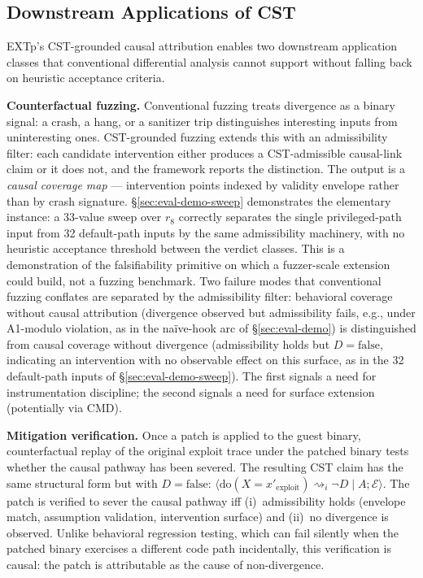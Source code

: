 \documentclass[conference]{IEEEtran}
\begin{document}
\subsection{Downstream Applications of CST}\label{sec:discussion-fuzz}

EXTp's CST-grounded causal attribution enables two downstream
application classes that conventional differential analysis cannot
support without falling back on heuristic acceptance criteria.

\textbf{Counterfactual fuzzing.} Conventional fuzzing treats
divergence as a binary signal: a crash, a hang, or a sanitizer
trip distinguishes interesting inputs from uninteresting ones.
CST-grounded fuzzing extends this with an admissibility filter:
each candidate intervention either produces a CST-admissible
causal-link claim or it does not, and the framework reports the
distinction. The output is a \emph{causal coverage map} ---
intervention points indexed by validity envelope rather than by
crash signature. \S\ref{sec:eval-demo-sweep} demonstrates the
elementary instance: a 33-value sweep over $r_8$ correctly
separates the single privileged-path input from 32 default-path
inputs by the same admissibility machinery, with no heuristic
acceptance threshold between the verdict classes. This is a
demonstration of the falsifiability primitive on which a
fuzzer-scale extension could build, not a fuzzing benchmark.
Two failure modes that conventional fuzzing conflates are
separated by the admissibility filter: behavioral coverage
without causal attribution (divergence observed but admissibility
fails, e.g., under A1-modulo violation, as in the naïve-hook
arc of \S\ref{sec:eval-demo}) is distinguished from causal
coverage without divergence (admissibility holds but
$D = \text{false}$, indicating an intervention with no observable
effect on this surface, as in the 32 default-path inputs of
\S\ref{sec:eval-demo-sweep}). The first signals a need for
instrumentation discipline; the second signals a need for
surface extension (potentially via CMD).

\textbf{Mitigation verification.} Once a patch is applied to the
guest binary, counterfactual replay of the original exploit trace
under the patched binary tests whether the causal pathway has
been severed. The resulting CST claim has the same structural
form but with $D = \text{false}$:
$\langle \text{do}(X{=}x'_\text{exploit}) \rightsquigarrow_i \neg D
\mid A; \mathcal{E}\rangle$. The patch is verified to sever the
causal pathway iff (i)~admissibility holds (envelope match,
assumption validation, intervention surface) and (ii)~no divergence
is observed. Unlike behavioral regression testing, which can fail
silently when the patched binary exercises a different code path
incidentally, this verification is causal: the patch is
attributable as the cause of non-divergence.
\end{document}
